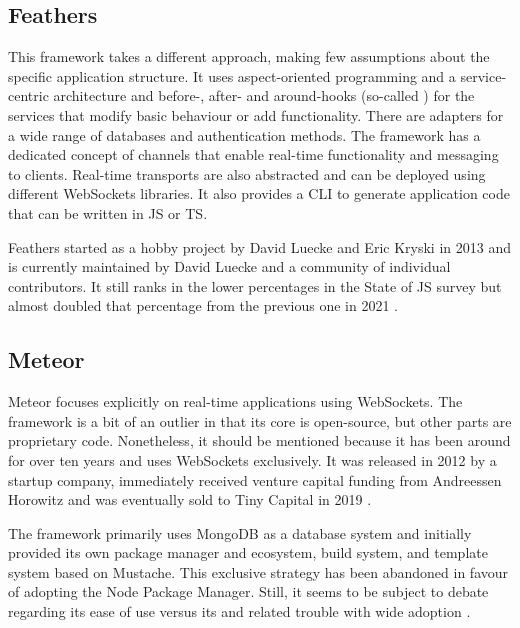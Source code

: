 \subsection{Feathers}

This framework takes a different approach, making few assumptions about the specific application structure. It uses aspect-oriented programming and a service-centric architecture and before-, after- and around-hooks (so-called ) for the services that modify basic behaviour or add functionality. There are adapters for a wide range of databases and authentication methods. The framework has a dedicated concept of channels that enable real-time functionality and messaging to clients. Real-time transports are also abstracted and can be deployed using different WebSockets libraries. It also provides a \ac{CLI} to generate application code that can be written in \ac{JS} or \ac{TS}.

Feathers started as a hobby project by David Luecke and Eric Kryski in 2013 \parencite{feathersFrameworkHistory} and is currently maintained by David Luecke and a community of individual contributors. It still ranks in the lower percentages in the State of JS survey but almost doubled that percentage from the previous one in 2021 \parencite{mostUsedBackendFrameworks21}.

\subsection{Meteor}

Meteor focuses explicitly on real-time applications using WebSockets. The framework is a bit of an outlier in that its core is open-source, but other parts are proprietary code. Nonetheless, it should be mentioned because it has been around for over ten years and uses WebSockets exclusively. It was released in 2012 by a startup company, immediately received venture capital funding from Andreessen Horowitz and was eventually sold to Tiny Capital in 2019 \parencite{meteorSaleTinyCapital}.

The framework primarily uses MongoDB as a database system and initially provided its own package manager and ecosystem, build system, and template system based on Mustache. This exclusive strategy has been abandoned in favour of adopting the Node Package Manager. Still, it seems to be subject to debate regarding its ease of use versus its  and related trouble with wide adoption \parencite{meteorDiscussionYCombinator}.


